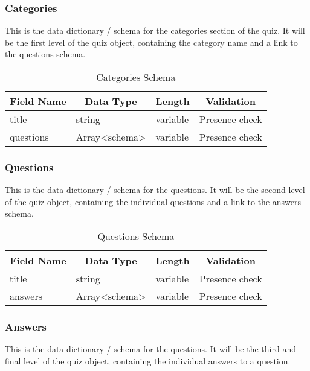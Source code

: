 \subsubsection{Categories}
This is the data dictionary / schema for the categories section of the quiz. It will be the first level of the quiz object, containing the category name and a link to the questions schema.\\

\begin{table}[!htbp]
\centering
\begin{tabular}{|l|l|l|l|}
\hline
\multicolumn{1}{|c|}{{\bf Field Name}} & \multicolumn{1}{c|}{{\bf Data Type}} & \multicolumn{1}{c|}{{\bf Length}} & \multicolumn{1}{c|}{{\bf Validation}} \\ \hline
title & string & variable & Presence check \\ \hline
questions & Array<schema> & variable & Presence check \\ \hline
\end{tabular}
\caption{Categories Schema}
\end{table}

\subsubsection{Questions}
This is the data dictionary / schema for the questions. It will be the second level of the quiz object, containing the individual questions and a link to the answers schema.\\

\begin{table}[!htbp]
\centering
\begin{tabular}{|l|l|l|l|}
\hline
\multicolumn{1}{|c|}{{\bf Field Name}} & \multicolumn{1}{c|}{{\bf Data Type}} & \multicolumn{1}{c|}{{\bf Length}} & \multicolumn{1}{c|}{{\bf Validation}} \\ \hline
title & string & variable & Presence check \\ \hline
answers & Array<schema> & variable & Presence check \\ \hline
\end{tabular}
\caption{Questions Schema}
\end{table}

\subsubsection{Answers}
This is the data dictionary / schema for the questions. It will be the third and final level of the quiz object, containing the individual answers to a question.\\

